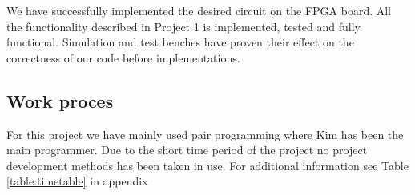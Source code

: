 We have successfully implemented the desired circuit on the FPGA board. 
All the functionality described in Project 1 is implemented, tested and fully functional.
Simulation and test benches have proven their effect on the correctness of our code before implementations.

\subsection{Work proces} 
For this project we have mainly used pair programming where Kim has been the main programmer.
Due to the short time period of the project no project development methods has been taken in use.
For additional information see Table \ref{table:timetable} in appendix 